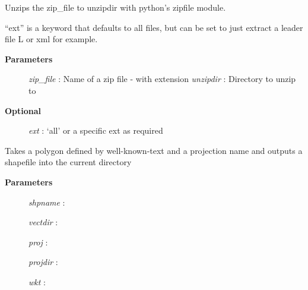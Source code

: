 \documentclass[letterpaper,10pt,english]{sphinxmanual}
\begin{document}

\begin{fulllineitems}
\label{code:Util.unZip}
Unzips the zip\_file to unzipdir with python's zipfile module.

``ext'' is a keyword that defaults to all files, but can be set
to just extract a leader file L or xml for example.
\begin{description}
\item[{\textbf{Parameters}}] \leavevmode
\emph{zip\_file}  : Name of a zip file - with extension
\emph{unzipdir}  : Directory to unzip to

\item[{\textbf{Optional}}] \leavevmode
\emph{ext} : `all' or a specific ext as required

\end{description}

\end{fulllineitems}


\begin{fulllineitems}
\label{code:Util.wkt2shp}
Takes a polygon defined by well-known-text and a projection name and outputs
a shapefile into the current directory
\begin{description}
\item[{\textbf{Parameters}}] \leavevmode
\emph{shpname}   :

\emph{vectdir}   :

\emph{proj}      :

\emph{projdir}   :

\emph{wkt}       :

\end{description}

\end{fulllineitems}

\end{document}
